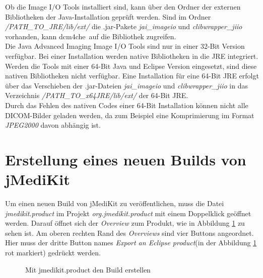 Ob die Image I/O Tools installiert sind, kann über den Ordner der externen Bibliotheken der Java-Installation geprüft werden. Sind im Ordner \textit{/PATH\_TO\_JRE/lib/ext/} die .jar-Pakete \textit{jai\_imageio} und \textit{clibwrapper\_jiio} vorhanden, kann \glqq dcm4che\grqq\ auf die Bibliothek zugreifen.\\
Die Java Advanced Imaging Image I/O Tools sind nur in einer 32-Bit Version verfügbar. Bei einer Installation werden native Bibliotheken in die JRE integriert. Werden die Tools mit einer 64-Bit Java und Eclipse Version eingesetzt, sind diese nativen Bibliotheken nicht verfügbar.
Eine Installation für eine 64-Bit JRE erfolgt über das Verschieben der .jar-Dateien \textit{jai\_imageio} und \textit{clibwrapper\_jiio} in das Verzeichnis \textit{/PATH\_TO\_x64JRE/lib/ext/} der 64-Bit JRE.\\
Durch das Fehlen des nativen Codes einer 64-Bit Installation können nicht alle DICOM-Bilder geladen werden, da zum Beispiel eine Komprimierung im Format \textit{JPEG2000} davon abhängig ist. 

\section{Erstellung eines neuen Builds von jMediKit}

Um einen neuen Build von jMediKit zu veröffentlichen, muss die Datei \textit{jmedikit.product} im Projekt \textit{org.jmedikit.product} mit einem Doppelklick geöffnet werden. Darauf öffnet sich der \textit{Overview} zum Produkt, wie in Abbildung \ref{build} zu sehen ist. Am oberen rechten Rand des \textit{Overviews} sind vier Buttons angeordnet. Hier muss der dritte Button names \textit{Export an Eclipse product}(in der Abbildung \ref{build} rot markiert) gedrückt werden.

\begin{figure}[H]
  \vspace{0.5cm}
  \centering
  \caption {Mit jmedikit.product den Build erstellen}
  \label{build}
  \vspace{0.5cm}
\end{figure}

